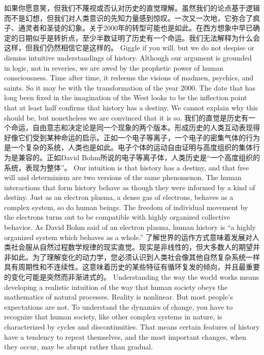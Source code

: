 \begin{paracol}{2}
\switchcolumn*
如果你愿意笑，但我们不蔑视或否认对历史的直觉理解。虽然我们的论点基于逻辑而不是幻想，但我们对人类意识的先知力量感到惊叹。一次又一次地，它弥合了疯子、通灵者和圣徒的幻象。关于2000年的转型可能也是如此。在西方想象中早已确定的日期似乎是转折点，至少半数证明了历史有一个命运。我们无法解释为什么会这样，但我们仍然相信它是这样的。
\switchcolumn
Giggle if you will, but we do not despise or dismiss intuitive understandings of history. Although our argument is grounded in logic, not in reveries, we are awed by the prophetic power of human consciousness. Time after time, it redeems the visions of madmen, psychics, and saints. So it may be with the transformation of the year 2000. The date that has long been fixed in the imagination of the West looks to be the inflection point that at least half confirms that history has a destiny. We cannot explain why this should be, but nonetheless we are convinced that it is so.
\switchcolumn*
我们的直觉是历史有一个命运，自由意志和决定论是同一个现象的两个版本。形成历史的人类互动表现得好像它们受到某种命运的启示。正如一个电子等离子，一个电子的密集气体的行为是一个复杂的系统，人类也是如此。电子个体的运动自由证明与高度组织的集体行为是兼容的。正如David Bohm所说的电子等离子体，人类历史是“一个高度组织的系统，表现为整体”。
\switchcolumn
Our intuition is that history has a destiny, and that free will and determinism are two versions of the same phenomenon. The human interactions that form history behave as though they were informed by a kind of destiny. Just as an electron plasma, a dense gas of electrons, behaves as a complex system, so do human beings. The freedom of individual movement by the electrons turns out to be compatible with highly organized collective behavior. As David Bohm said of an electron plasma, human history is ``a highly organized system which behaves as a whole.''
\switchcolumn*
了解世界的运作方式意味着发展对人类社会服从自然过程数学规律的现实直觉。现实是非线性的，但大多数人的期望并非如此。为了理解变化的动力学，您必须认识到人类社会像其他自然复杂系统一样具有周期性和不连续性。这意味着历史的某些特征有循环复发的倾向，并且最重要的变化可能是突然而非渐进式的。
\switchcolumn
Understanding the way the world works means developing a realistic intuition of the way that human society obeys the mathematics of natural processes. Reality is nonlinear. But most people's expectations are not. To understand the dynamics of change, you have to recognize that human society, like other complex systems in nature, is characterized by cycles and discontinuities. That means certain features of history have a tendency to repeat themselves, and the most important changes, when they occur, may be abrupt rather than gradual.

\end{paracol}
